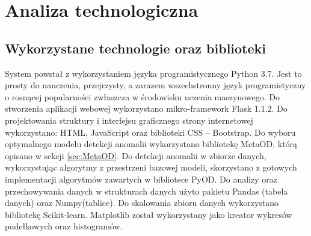 \section{Analiza technologiczna}
\subsection{Wykorzystane technologie oraz biblioteki}
System powstał z wykorzystaniem języka programistycznego Python 3.7. Jest to prosty do nauczenia, przejrzysty, a zarazem wszechstronny język programistyczny o rosnącej popularności zwłaszcza w środowisku uczenia maszynowego. Do stworzenia aplikacji webowej wykorzystano mikro-framework Flask 1.1.2. Do projektowania struktury i interfejsu graficznego strony internetowej wykorzystano: HTML, JavaScript oraz biblioteki CSS -- Bootstrap.
Do wyboru optymalnego modelu detekcji anomalii wykorzystano bibliotekę MetaOD, którą opisano w sekcji \ref{sec:MetaOD}. Do detekcji anomalii w zbiorze danych, wykorzystując algorytmy z przestrzeni bazowej modeli, skorzystano z gotowych implementacji algorytmów zawartych w bibliotece PyOD. 
Do analizy oraz przechowywania danych w strukturach danych użyto pakietu Pandas (tabela danych) oraz Numpy(tablice). Do skalowania zbioru danych wykorzystano bibliotekę Scikit-learn. Matplotlib został wykorzystany jako kreator wykresów pudełkowych oraz histogramów.

